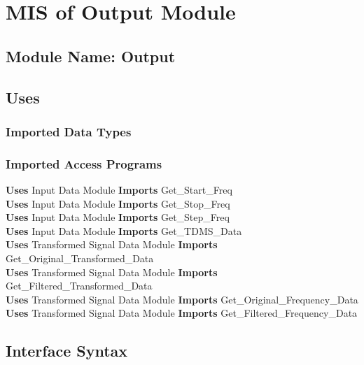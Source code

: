 \documentclass[12pt]{article}
\begin{document}
\section{MIS of Output Module}
\subsection{Module Name: Output}
\subsection{Uses}
\subsubsection{Imported Data Types}

\subsubsection{Imported Access Programs}
\textbf{Uses} Input Data Module \textbf{Imports} Get\_Start\_Freq\\
\textbf{Uses} Input Data Module \textbf{Imports} Get\_Stop\_Freq\\
\textbf{Uses} Input Data Module \textbf{Imports} Get\_Step\_Freq\\
\textbf{Uses} Input Data Module \textbf{Imports} Get\_TDMS\_Data\\
\textbf{Uses} Transformed Signal Data Module 
\textbf{Imports} Get\_Original\_Transformed\_Data\\
\textbf{Uses} Transformed Signal Data Module 
\textbf{Imports} Get\_Filtered\_Transformed\_Data\\
\textbf{Uses} Transformed Signal Data Module 
\textbf{Imports} Get\_Original\_Frequency\_Data\\
\textbf{Uses} Transformed Signal Data Module 
\textbf{Imports} Get\_Filtered\_Frequency\_Data\\
\subsection{Interface Syntax}
\end{document}
